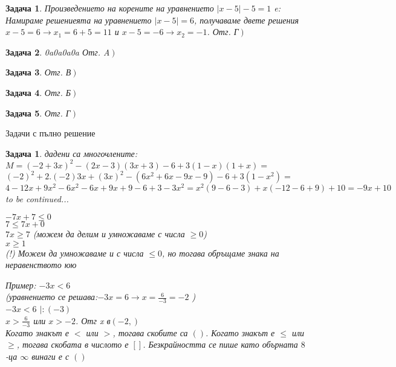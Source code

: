 \documentclass{article}
\theoremstyle{plain}
\newtheorem*{problem*}{Задача}
\newtheorem{problem}{Задача}
\begin{document}
\begin{problem*} Произведението на корените на уравнението $\left|x-5 \right| -5 = 1 $ e: \\
	Намираме решениеята на уравнението $\left|x-5 \right| = 6 $, получаваме двете решения $x-5 = 6 \to x_1 = 6+5=11 $ и $x-5=-6 \to x_2 = -1 $.
	Отг. Г$\left. \right)$ 
\end{problem*}
\begin{problem*}0a0a0a0a
	Отг. A$\left. \right)$ 
\end{problem*}
\begin{problem*}
	Отг. В$\left. \right)$ 
\end{problem*}
\begin{problem*}
	Отг. Б$\left. \right)$ 
\end{problem*}
\begin{problem*}
	Отг. Г$\left. \right)$ 
\end{problem*}



Задачи с пълно решение \\
\begin{problem}
дадени са многочлените: \\
$M = (-2+3x)^2 -(2x-3)(3x+3) -6 +3(1-x)(1+x) = $\\ $(-2)^2 + 2.(-2)3x + (3x)^2  -(6x^2 + 6x -9x -9) -6 +3(1-x^2) =$\\
$4 - 12x + 9x^2 - 6x^2-6x +9x+9 -6 + 3 -3x^2 = x^2(9-6-3)+x(-12-6+9) +10 = -9x+10 $ \\ to be continued...

$-7x+7 \leq 0 $ \\
$ 7 \leq 7x +0 $\\
$ 7x \geq 7 $ (можем да делим и умножаваме с числа $ \geq 0$) \\ 
$ x \geq 1 $ \\
(!) Можем да умножаваме и с числа $\leq 0 $, но тогава обръщаме знака на неравенството юю

Пример:
$-3x < 6$ \\
(уравнението се решава:$-3x = 6 \to x = \frac{6}{-3} = -2 $  ) \\
$-3x < 6$ $|:(-3)$ \\
$x > \frac{6}{-3} $ или $x>-2 $. Отг x в$ (-2,)$ \\
Когато знакът е $<$ или $>$, тогава скобите са $()$. Когато знакът е $\leq $ или $\geq $, тогава скобата в числото е $[] $. Безкрайността се пише като обърната $8$-ца $\infty $ винаги е с $() $


 \end{problem}
\end{document}
